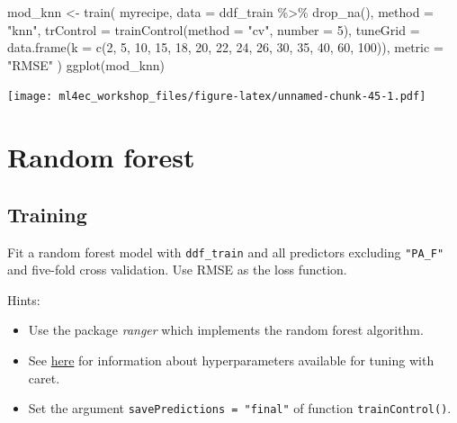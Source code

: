 \documentclass[
]{book}
\newenvironment{Shaded}{\begin{snugshade}}{\end{snugshade}}
\newcommand{\AttributeTok}[1]{\textcolor[rgb]{0.77,0.63,0.00}{#1}}
\newcommand{\DecValTok}[1]{\textcolor[rgb]{0.00,0.00,0.81}{#1}}
\newcommand{\FunctionTok}[1]{\textcolor[rgb]{0.00,0.00,0.00}{#1}}
\newcommand{\NormalTok}[1]{#1}
\newcommand{\OtherTok}[1]{\textcolor[rgb]{0.56,0.35,0.01}{#1}}
\newcommand{\SpecialCharTok}[1]{\textcolor[rgb]{0.00,0.00,0.00}{#1}}
\newcommand{\StringTok}[1]{\textcolor[rgb]{0.31,0.60,0.02}{#1}}
\providecommand{\tightlist}{%
  \setlength{\itemsep}{0pt}\setlength{\parskip}{0pt}}
\begin{document}
\begin{Shaded}
\begin{Highlighting}[]
\NormalTok{mod\_knn }\OtherTok{\textless{}{-}} \FunctionTok{train}\NormalTok{(}
\NormalTok{  myrecipe, }
  \AttributeTok{data =}\NormalTok{ ddf\_train }\SpecialCharTok{\%\textgreater{}\%} 
    \FunctionTok{drop\_na}\NormalTok{(), }
  \AttributeTok{method =} \StringTok{"knn"}\NormalTok{,}
  \AttributeTok{trControl =} \FunctionTok{trainControl}\NormalTok{(}\AttributeTok{method =} \StringTok{"cv"}\NormalTok{, }\AttributeTok{number =} \DecValTok{5}\NormalTok{),}
  \AttributeTok{tuneGrid =} \FunctionTok{data.frame}\NormalTok{(}\AttributeTok{k =} \FunctionTok{c}\NormalTok{(}\DecValTok{2}\NormalTok{, }\DecValTok{5}\NormalTok{, }\DecValTok{10}\NormalTok{, }\DecValTok{15}\NormalTok{, }\DecValTok{18}\NormalTok{, }\DecValTok{20}\NormalTok{, }\DecValTok{22}\NormalTok{, }\DecValTok{24}\NormalTok{, }\DecValTok{26}\NormalTok{, }\DecValTok{30}\NormalTok{, }\DecValTok{35}\NormalTok{, }\DecValTok{40}\NormalTok{, }\DecValTok{60}\NormalTok{, }\DecValTok{100}\NormalTok{)),}
  \AttributeTok{metric =} \StringTok{"RMSE"}
\NormalTok{  )}
\FunctionTok{ggplot}\NormalTok{(mod\_knn)}
\end{Highlighting}
\end{Shaded}

\texttt{[image: ml4ec\_workshop\_files/figure-latex/unnamed-chunk-45-1.pdf]}

\hypertarget{random-forest-1}{%
\section{Random forest}\label{random-forest-1}}

\hypertarget{training-6}{%
\subsection{Training}\label{training-6}}

Fit a random forest model with \texttt{ddf\_train} and all predictors excluding \texttt{"PA\_F"} and five-fold cross validation. Use RMSE as the loss function.

Hints:

\begin{itemize}
\tightlist
\item
  Use the package \emph{ranger} which implements the random forest algorithm.
\item
  See \href{https://topepo.github.io/caret/available-models.html}{here} for information about hyperparameters available for tuning with caret.
\item
  Set the argument \texttt{savePredictions\ =\ "final"} of function \texttt{trainControl()}.
\end{itemize}
\end{document}
